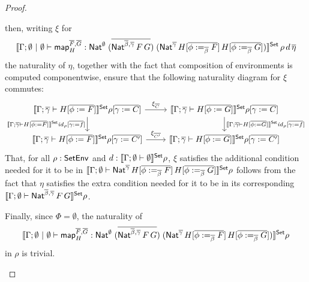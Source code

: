 \documentclass[acmsmall,review,anonymous]{acmart}
\theoremstyle{definition}
\renewcommand{\id}{\mathit{id}}
\newcommand{\map}{\mathsf{map}}
\begin{document}
\begin{proof}
\begin{itemize}
then, writing $\xi$ for
\[
\oCPOsem{\Gamma; \emptyset~|~\emptyset \vdash \map^{\ol{F},\ol{G}}_H
    : \Nat^\emptyset\;(\ol{\Nat^{\ol{\beta},\ol{\gamma}}\,F\,G})\;
    (\Nat^{\ol{\gamma}}\,H[\ol{\phi :=_{\ol{\beta}} F}]\,H[\ol{\phi
        :=_{\ol{\beta}} G}])}\,\rho\,d\, \ol{\eta}
\]
the naturality of $\eta$,
together with the fact that composition of environments is
computed componentwise, ensure that the following naturality diagram
for $\xi$ commutes:
{\footnotesize
\[\begin{tikzcd}
\oCPOsem{\Gamma ;\ol{\gamma} \vdash H[\ol{\phi := F}]}\rho[\ol{\gamma
      := C}] \ar[r, "{\xi_{\ol{C}}}"]
\ar[d, "{\oCPOsem{\Gamma ;\ol{\gamma} \vdash H[\ol{\phi :=
          F}]}\id_{\rho}[\ol{\gamma := f}]}"']
& \oCPOsem{\Gamma ; \ol{\gamma} \vdash H[\ol{\phi := G}]}\rho[\ol{\gamma
      := C}]
\ar[d, "{\oCPOsem{\Gamma ; \ol{\gamma} \vdash H[\ol{\phi :=
          G}]}\id_{\rho}[\ol{\gamma := f}]}"]\\
\oCPOsem{\Gamma ;\ol{\gamma} \vdash H[\ol{\phi := F}]}\rho[\ol{\gamma
      := C'}] \ar[r, "{\xi_{\ol{C'}}}"]
& \oCPOsem{\Gamma ; \ol{\gamma} \vdash H[\ol{\phi := G}]}\rho[\ol{\gamma
      := C'}] 
\end{tikzcd}\]}
That, for all $\rho : \mathsf{SetEnv}$ and $d : \llbracket{\Gamma; \emptyset \vdash
  \emptyset}\rrbracket^{\mathsf{Set}}\rho$, $\xi$ satisfies the additional condition needed for
it to be in $\llbracket{\Gamma; \emptyset \vdash
  \mathsf{Nat}^{\overline{\gamma}}\,H[\overline{\phi :=_{\overline{\beta}} F}]\,H[\overline{\phi
      :=_{\overline{\beta}} G}]}\rrbracket^{\mathsf{Set}}\rho$ follows from the fact
that $\eta$ satisfies the extra
condition needed for it to be in its corresponding
$\llbracket{\Gamma; \emptyset \vdash \mathsf{Nat}^{\overline{\beta},\overline{\gamma}}\,F\,G}\rrbracket^{\mathsf{Set}} \rho$.

Finally, since $\Phi = \emptyset$, the naturality of
\[
\oCPOsem{\Gamma; \emptyset~|~\emptyset \vdash \map^{\ol{F},\ol{G}}_H
    : \Nat^\emptyset\;(\ol{\Nat^{\ol{\beta},\ol{\gamma}}\,F\,G})\;
    (\Nat^{\ol{\gamma}}\,H[\ol{\phi :=_{\ol{\beta}} F}]\,H[\ol{\phi
        :=_{\ol{\beta}} G}])}\rho
\]
in $\rho$ is trivial.


\end{itemize}
\end{proof}
\end{document}
